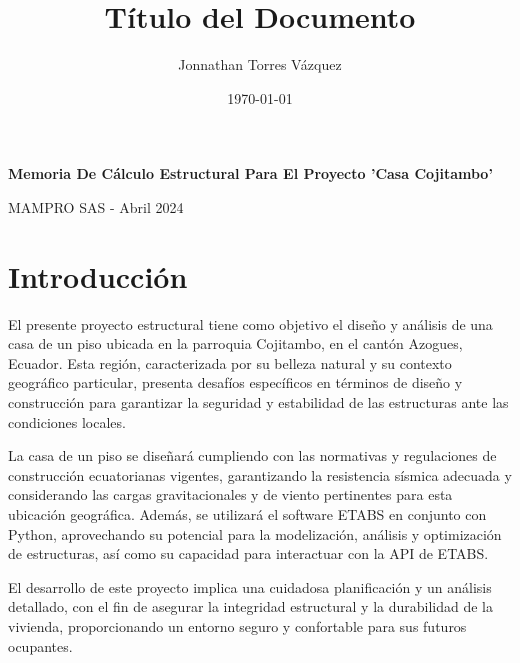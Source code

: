\documentclass{report}
\title{Título del Documento}
\author{Jonnathan Torres Vázquez}
\date{\today}
\begin{document}
\pagecolor{azulportada}
\begin{titlepage}

    \vfill
    \begin{center}
        \vspace{5cm}
        {\Huge \textbf{Memoria De Cálculo Estructural Para El Proyecto 'Casa Cojitambo'} \par}

        \vspace{15cm}
        {\Large MAMPRO SAS - Abril 2024 \par}
        
    \end{center}
    \vfill
\end{titlepage}

\pagecolor{white}

\chapter{Introducción}
El presente proyecto estructural tiene como objetivo el diseño y análisis de una casa de un piso ubicada en la parroquia Cojitambo, en el cantón Azogues, Ecuador. Esta región, caracterizada por su belleza natural y su contexto geográfico particular, presenta desafíos específicos en términos de diseño y construcción para garantizar la seguridad y estabilidad de las estructuras ante las condiciones locales.

La casa de un piso se diseñará cumpliendo con las normativas y regulaciones de construcción ecuatorianas vigentes, garantizando la resistencia sísmica adecuada y considerando las cargas gravitacionales y de viento pertinentes para esta ubicación geográfica. Además, se utilizará el software ETABS en conjunto con Python, aprovechando su potencial para la modelización, análisis y optimización de estructuras, así como su capacidad para interactuar con la API de ETABS.

El desarrollo de este proyecto implica una cuidadosa planificación y un análisis detallado, con el fin de asegurar la integridad estructural y la durabilidad de la vivienda, proporcionando un entorno seguro y confortable para sus futuros ocupantes.
\end{document}
